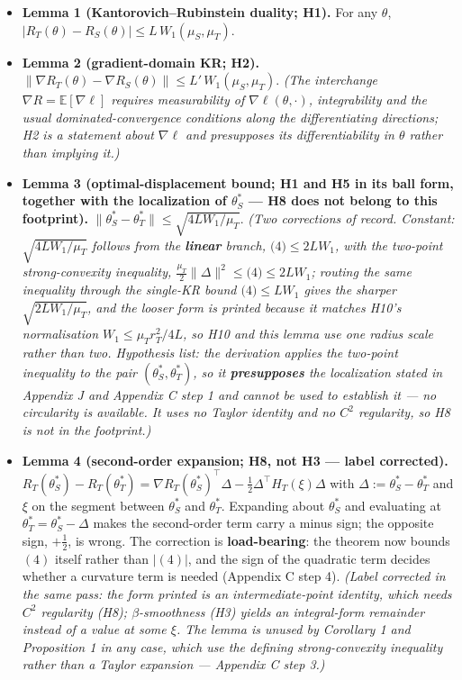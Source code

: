 \documentclass[pdflatex,sn-mathphys-ay]{sn-jnl}
\begin{document}
\begin{itemize}
\item \textbf{Lemma 1 (Kantorovich--Rubinstein duality; H1).} For any $\theta$, $|R_T(\theta)-R_S(\theta)| \le L\,W_1(\mu_S,\mu_T)$.
\item \textbf{Lemma 2 (gradient-domain KR; H2).} $\|\nabla R_T(\theta)-\nabla R_S(\theta)\| \le L'\,W_1(\mu_S,\mu_T)$. \emph{(The interchange $\nabla R = \mathbb E[\nabla\ell]$ requires measurability of $\nabla\ell(\theta,\cdot)$, integrability and the usual dominated-convergence conditions along the differentiating directions; H2 is a statement about $\nabla\ell$ and presupposes its differentiability in $\theta$ rather than implying it.)}
\item \textbf{Lemma 3 (optimal-displacement bound; H1 and H5 in its ball form, together with the localization of $\theta^*_S$ --- H8 does not belong to this footprint).} $\|\theta^*_S-\theta^*_T\| \le \sqrt{4LW_1/\mu_T}$. \emph{(Two corrections of record. Constant: $\sqrt{4LW_1/\mu_T}$ follows from the \textbf{linear} branch, $\text{(4)}\le2LW_1$, with the two-point strong-convexity inequality, $\tfrac{\mu_T}{2}\|\Delta\|^2\le\text{(4)}\le2LW_1$; routing the same inequality through the single-KR bound $\text{(4)}\le LW_1$ gives the sharper $\sqrt{2LW_1/\mu_T}$, and the looser form is printed because it matches H10's normalisation $W_1\le\mu_T r_T^2/4L$, so H10 and this lemma use one radius scale rather than two. Hypothesis list: the derivation applies the two-point inequality to the pair $(\theta^*_S,\theta^*_T)$, so it \textbf{presupposes} the localization stated in Appendix J and Appendix C step 1 and cannot be used to establish it --- no circularity is available. It uses no Taylor identity and no $C^2$ regularity, so H8 is not in the footprint.)}
\item \textbf{Lemma 4 (second-order expansion; H8, not H3 --- label corrected).} $R_T(\theta^*_S)-R_T(\theta^*_T) = \nabla R_T(\theta^*_S)^\top\Delta - \tfrac12 \Delta^\top H_T(\xi)\Delta$ with $\Delta := \theta^*_S-\theta^*_T$ and $\xi$ on the segment between $\theta^*_S$ and $\theta^*_T$. Expanding about $\theta^*_S$ and evaluating at $\theta^*_T = \theta^*_S - \Delta$ makes the second-order term carry a minus sign; the opposite sign, $+\tfrac12$, is wrong. The correction is \textbf{load-bearing}: the theorem now bounds $(4)$ itself rather than $|(4)|$, and the sign of the quadratic term decides whether a curvature term is needed (Appendix C step 4). \emph{(Label corrected in the same pass: the form printed is an intermediate-point identity, which needs $C^2$ regularity (H8); $\beta$-smoothness (H3) yields an integral-form remainder instead of a value at some $\xi$. The lemma is unused by Corollary 1 and Proposition 1 in any case, which use the defining strong-convexity inequality rather than a Taylor expansion --- Appendix C step 3.)}

\end{itemize}
\end{document}
